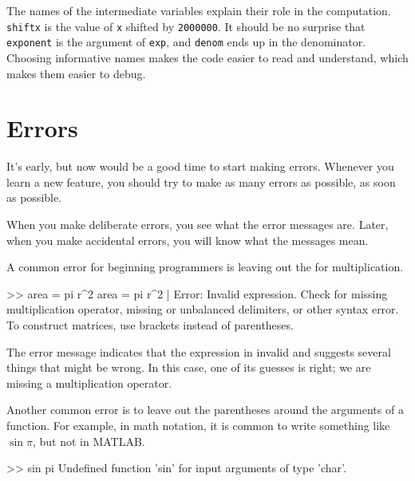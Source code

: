 \documentclass[main.tex]{subfiles}
\begin{document}
\begin{itemize}
The names of the intermediate variables explain their role in the
computation.  {\tt shiftx} is the value of {\tt x} shifted by 
{\tt 2000000}.  It should be no surprise that {\tt exponent} is the argument of {\tt exp}, and {\tt denom} ends up in the denominator.  Choosing informative names makes the code easier to read and understand, which makes them easier to debug.


\end{itemize}

\section{Errors}


It's early, but now would be a good time to start making errors.
Whenever you learn a new feature, you should try to make as many errors as possible, as soon as possible.

When you make deliberate errors, you see what the error messages are.
Later, when you make accidental errors, you will know what the messages mean.

A common error for beginning programmers is leaving out the {\tt *}
for multiplication.

\begin{code}
>> area = pi r^2
 area = pi r^2
           |
Error: Invalid expression. Check for missing multiplication operator, 
missing or unbalanced delimiters, or other syntax error.
To construct matrices, use brackets instead of parentheses.
\end{code}


The error message indicates that the expression in invalid and suggests several things that might be wrong.  In this case, one of its guesses is right; we are missing a multiplication operator.


Another common error is to leave out the parentheses around the
arguments of a function.  For example, in math notation, it is common
to write something like $\sin \pi$, but not in MATLAB.

\begin{code}
>> sin pi
Undefined function 'sin' for input arguments of type 'char'.
\end{code}
\end{document}
